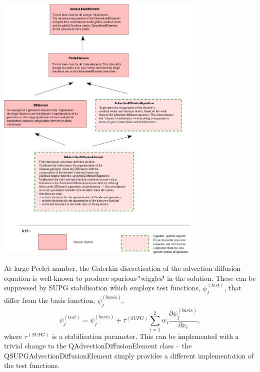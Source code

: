  
\begin{DoxyImage}
\includegraphics[width=0.75\textwidth]{advection_diffusion_element_inheritance}
\end{DoxyImage}


At large Peclet number, the Galerkin discretisation of the advection diffusion equation is well-\/known to produce spurious \char`\"{}wiggles\char`\"{} in the solution. These can be suppressed by S\+U\+PG stabilisation which employs test functions, $ \psi_j^{(test)} $, that differ from the basis function, $ \psi_j^{(basis)} $, \[ \psi_j^{(test)} = \psi_j^{(basis)} + \tau^{(SUPG)} \sum_{i=1}^2 w_i \frac{\partial \psi_j^{(basis)}}{\partial x_i}, \] where $ \tau^{(SUPG)} $ is a stabilisation parameter. This can be implemented with a trivial change to the {\ttfamily Q\+Advection\+Diffusion\+Element} class -- the {\ttfamily Q\+S\+U\+P\+G\+Advection\+Diffusion\+Element} simply provides a different implementation of the test functions.



